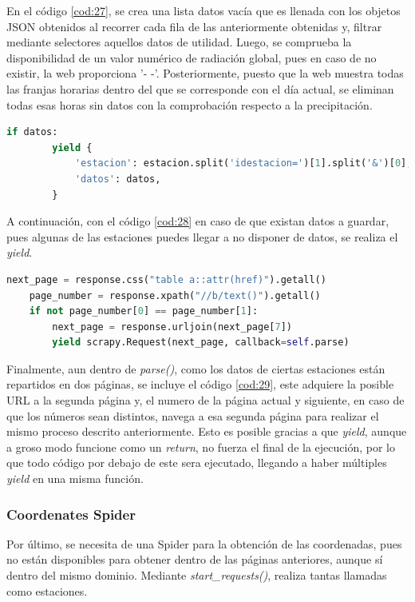 En el código \ref{cod:27}, se crea una lista datos vacía que es llenada con los objetos JSON obtenidos al recorrer cada fila de las anteriormente obtenidas y, filtrar mediante selectores aquellos datos de utilidad. Luego, se comprueba la disponibilidad de un valor numérico de radiación global, pues en caso de no existir, la web proporciona '- -'. Posteriormente, puesto que la web muestra todas las franjas horarias dentro del que se corresponde con el día actual, se eliminan todas esas horas sin datos con la comprobación respecto a la precipitación.

\begin{lstlisting}[language=Python, caption={Comprobacion exitencia de datos y guardado de MeteoNavarra Data Spider}, label=cod:28]
	if datos:
		yield {
			'estacion': estacion.split('idestacion=')[1].split('&')[0],
			'datos': datos,
		}
\end{lstlisting}

A continuación, con el código \ref{cod:28} en caso de que existan datos a guardar, pues algunas de las estaciones puedes llegar a no disponer de datos, se realiza el \textit{yield}.

\begin{lstlisting}[language=Python, caption={Navegacion a segunda página de datos en MeteoNavarra Data Spider}, label=cod:29]
	next_page = response.css("table a::attr(href)").getall()
	page_number = response.xpath("//b/text()").getall()
	if not page_number[0] == page_number[1]:
		next_page = response.urljoin(next_page[7])
		yield scrapy.Request(next_page, callback=self.parse)
\end{lstlisting}

Finalmente, aun dentro de \textit{parse()}, como los datos de ciertas estaciones están repartidos en dos páginas, se incluye el código \ref{cod:29}, este adquiere la posible URL a la segunda página y, el numero de la página actual y siguiente, en caso de que los números sean distintos, navega a esa segunda página para realizar el mismo proceso descrito anteriormente.\newline
\newline
Esto es posible gracias a que \textit{yield}, aunque a groso modo funcione como un \textit{return}, no fuerza el final de la ejecución, por lo que todo código por debajo de este sera ejecutado, llegando a haber múltiples \textit{yield} en una misma función.

\subsubsection{Coordenates Spider}
Por último, se necesita de una Spider para la obtención de las coordenadas, pues no están disponibles para obtener dentro de las páginas anteriores, aunque sí dentro del mismo dominio.\newline
\newline
Mediante \textit{start\_requests()}, realiza tantas llamadas como estaciones.

